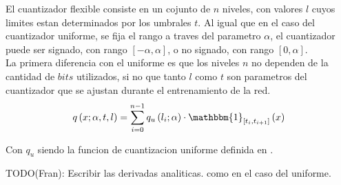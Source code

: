 El cuantizador flexible consiste en un cojunto de $n$ niveles, con valores $l$ cuyos limites estan determinados por los umbrales $t$. Al igual que en el caso del cuantizador uniforme, se fija el rango a traves del parametro $\alpha$, el cuantizador puede ser signado, con rango $[-\alpha, \alpha]$, o no signado, con rango $[0, \alpha]$. \\

La primera diferencia con el uniforme es que los niveles $n$ no dependen de la cantidad de $bits$ utilizados, si no que tanto $l$ como $t$ son parametros del cuantizador que se ajustan durante el entrenamiento de la red. \\

\begin{equation}
    \label{eq:flexible_quantizer}
    q\left(x; \alpha, t, l\right) = \sum_{i=0}^{n-1} q_u\left({l_i; \alpha}\right) \cdot \mathbbm{1}_{\left[t_i, t_{i+1}\right]}\left(x\right)
\end{equation}

Con $q_u$ siendo la funcion de cuantizacion uniforme definida en . \\






TODO(Fran): Escribir las derivadas analiticas. como en el caso del uniforme. \\
